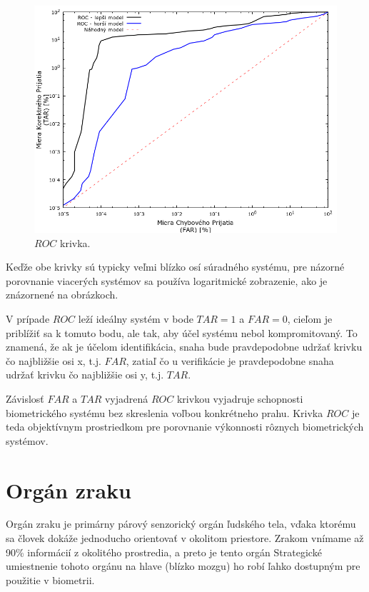\begin{figure}[h]
	\centering
	\includegraphics[width=13cm]{img/roc.png}
	\caption{$ROC$ krivka\cite{bio}.}
	\label{fig:roc}
\end{figure}

Keďže obe krivky sú typicky veľmi blízko osí súradného systému, pre názorné porovnanie viacerých systémov sa používa logaritmické zobrazenie, ako je znázornené na obrázkoch. 

V prípade $ROC$ leží ideálny systém v bode $TAR = 1$ a $FAR = 0$, cieľom je priblížiť sa k tomuto bodu, ale tak, aby účel systému nebol kompromitovaný. To znamená, že ak je účelom identifikácia, snaha bude pravdepodobne udržať krivku čo najbližšie osi x, t.j. $FAR$, zatiaľ čo u verifikácie je pravdepodobne snaha udržať krivku čo najbližšie osi y, t.j. $TAR$.

Závislosť $FAR$ a $TAR$ vyjadrená $ROC$ krivkou vyjadruje schopnosti biometrického systému bez skreslenia voľbou konkrétneho prahu. Krivka $ROC$ je teda objektívnym prostriedkom pre porovnanie výkonnosti rôznych biometrických systémov.

\chapter{Orgán zraku}\label{ch:kap1}
Orgán zraku je primárny párový senzorický orgán ľudského tela, vďaka ktorému sa človek dokáže jednoducho orientovať v okolitom priestore. Zrakom vnímame až 90\% informácií z okolitého prostredia, a preto je tento orgán Strategické umiestnenie tohoto orgánu na hlave (blízko mozgu) ho robí ľahko dostupným pre použitie v biometrii.

